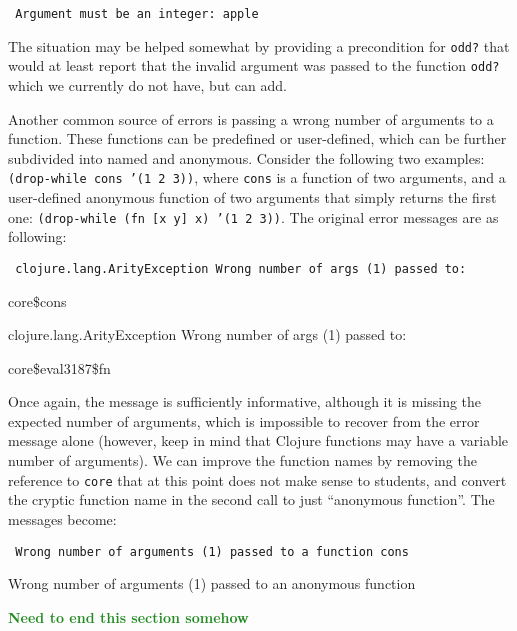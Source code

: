 \documentclass[submission,copyright,creativecommons]{eptcs}
\newcommand{\allcomments}[1]{{#1}}
\newcommand{\elenacomment}[1]{{\bf \textcolor{ForestGreen}{\allcomments{{#1}}}}}
\newcommand{\clocode}[1]{{\tt {#1}}}
\begin{document}
{\tt
Argument must be an integer: apple
}

\noindent 
The situation may be helped somewhat by providing a precondition for \clocode{odd?} that would at least report that the invalid argument was passed to the function \clocode{odd?} which we currently do not have, but can add. 

Another common source of  errors is passing a wrong number of arguments to a function. These functions can be predefined or user-defined, which can be further subdivided into named and anonymous. Consider the following two examples: \clocode{(drop-while cons '(1 2 3))}, where \clocode{cons} is a function of two arguments, and a user-defined anonymous function of two arguments that simply returns the first one: \clocode{(drop-while (fn [x y] x) '(1 2 3))}. The original error messages are as following:

{\tt
clojure.lang.ArityException Wrong number of args (1) passed to: 

core\$cons

clojure.lang.ArityException  Wrong number of args (1) passed to: 

core\$eval3187\$fn
}

\noindent
Once again, the message is sufficiently informative, although it is missing the expected number of arguments, which is impossible to recover from the error message alone (however, keep in mind that Clojure functions may have a variable number of arguments).  We can improve the function names by removing the reference to {\tt core} that at this point does not make sense to students, and convert the cryptic function name in the second call to just ``anonymous function''. The messages become:

{\tt
Wrong number of arguments (1)  passed to a function cons

Wrong number of arguments (1)  passed to an anonymous function
}

\elenacomment{Need to end this section somehow}


%
%
%
\end{document}

